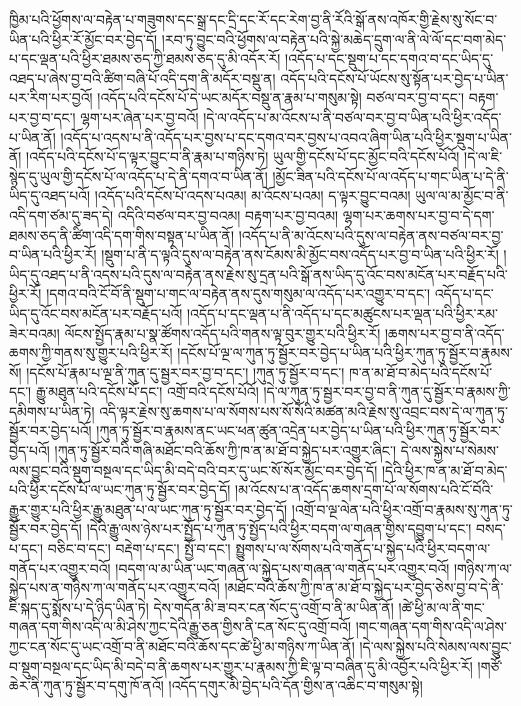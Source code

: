 ཁྱིམ་པའི་ཕྱོགས་ལ་བརྟེན་པ་གཟུགས་དང་སྒྲ་དང་དྲི་དང་རོ་དང་རེག་བྱ་ནི་རོའི་སྒོ་ནས་འཁོར་གྱི་རྗེས་སུ་སོང་བ་ཡིན་པའི་ཕྱིར་རོ་མྱོང་བར་བྱེད་དོ། །རབ་ཏུ་བྱུང་བའི་ཕྱོགས་ལ་བརྟེན་པའི་སྐྱེ་མཆེད་དྲུག་ལ་ནི་ལེ་ལོ་དང་བག་མེད་པ་དང་ལྡན་པའི་ཕྱིར་ཐམས་ཅད་ཀྱི་ཐམས་ཅད་དུ་མི་འདོར་རོ། །འདོད་པ་དང་སྡུག་པ་དང་དགའ་བ་དང་ཡིད་དུ་འཐད་པ་ཞེས་བྱ་བའི་ཚིག་བཞི་པོ་འདི་དག་ནི་མདོར་བསྡུ་ན། འདོད་པའི་དངོས་པོ་ཡོངས་སུ་སྟོན་པར་བྱེད་པ་ཡིན་པར་རིག་པར་བྱའོ། །འདོད་པའི་དངོས་པོ་དེ་ཡང་མདོར་བསྡུ་ན་རྣམ་པ་གསུམ་སྟེ། བཙལ་བར་བྱ་བ་དང་། བརྟག་པར་བྱ་བ་དང་། ལྷག་པར་ཞེན་པར་བྱ་བའོ། །དེ་ལ་འདོད་པ་མ་འོངས་པ་ནི་བཙལ་བར་བྱ་བ་ཡིན་པའི་ཕྱིར་འདོད་པ་ཡིན་ནོ། །འདོད་པ་འདས་པ་ནི་འདོད་པར་བྱས་པ་དང་དགའ་བར་བྱས་པ་འབའ་ཞིག་ཡིན་པའི་ཕྱིར་སྡུག་པ་ཡིན་ནོ། །འདོད་པའི་དངོས་པོ་ད་ལྟར་བྱུང་བ་ནི་རྣམ་པ་གཉིས་ཏེ། ཡུལ་གྱི་དངོས་པོ་དང་མྱོང་བའི་དངོས་པོའོ། །དེ་ལ་ཇི་སྙེད་དུ་ཡུལ་གྱི་དངོས་པོ་ལ་འདོད་པ་དེ་ནི་དགའ་བ་ཡིན་ནོ། །མྱོང་ཟིན་པའི་དངོས་པོ་ལ་འདོད་པ་གང་ཡིན་པ་དེ་ནི་ཡིད་དུ་འཐད་པའོ། །འདོད་པའི་དངོས་པོ་འདས་པའམ། མ་འོངས་པའམ། ད་ལྟར་བྱུང་བའམ། ཡུལ་ལ་མ་མྱོང་བ་ནི་འདི་དག་ཙམ་དུ་ཟད་དེ། འདིའི་བཙལ་བར་བྱ་བའམ། བརྟག་པར་བྱ་བའམ། ལྷག་པར་ཆགས་པར་བྱ་བ་དེ་དག་ཐམས་ཅད་ནི་ཚིག་འདི་དག་གིས་བསྟན་པ་ཡིན་ནོ། །འདོད་པ་ནི་མ་འོངས་པའི་དུས་ལ་བརྟེན་ནས་བཙལ་བར་བྱ་བ་ཡིན་པའི་ཕྱིར་རོ། །སྡུག་པ་ནི་ད་ལྟའི་དུས་ལ་བརྟེན་ནས་ངོམས་མི་མྱོང་བས་འདོད་པར་བྱ་བ་ཡིན་པའི་ཕྱིར་རོ། །ཡིད་དུ་འཐད་པ་ནི་འདས་པའི་དུས་ལ་བརྟེན་ནས་རྗེས་སུ་དྲན་པའི་སྒོ་ནས་ཡིད་དུ་འོང་བས་མངོན་པར་བརྗོད་པའི་ཕྱིར་རོ། །དགའ་བའི་ངོ་བོ་ནི་སྡུག་པ་གང་ལ་བརྟེན་ནས་དུས་གསུམ་ལ་འདོད་པར་འགྱུར་བ་དང་། འདོད་པ་དང་ཡིད་དུ་འོང་བས་མངོན་པར་བརྗོད་པའོ། །འདོད་པ་དང་ལྡན་པ་ནི་འདོད་པ་དང་མཚུངས་པར་ལྡན་པའི་ཕྱིར་རམ་ཟེར་བའམ། ལོངས་སྤྱོད་རྣམ་པ་སྣ་ཚོགས་འདོད་པའི་གནས་ལྟ་བུར་གྱུར་པའི་ཕྱིར་རོ། །ཆགས་པར་བྱ་བ་ནི་འདོད་ཆགས་ཀྱི་གནས་སུ་གྱུར་པའི་ཕྱིར་རོ། །དངོས་པོ་ལྔ་ལ་ཀུན་ཏུ་སྦྱོར་བར་བྱེད་པ་ཡིན་པའི་ཕྱིར་ཀུན་ཏུ་སྦྱོར་བ་རྣམས་སོ། །དངོས་པོ་རྣམ་པ་ལྔ་ནི་ཀུན་དུ་སྦྱར་བར་བྱ་བ་དང་། །ཀུན་ཏུ་སྦྱོར་བ་དང་། ཁ་ན་མ་ཐོ་བ་མེད་པའི་དངོས་པོ་དང་། རྒྱུ་མཐུན་པའི་དངོས་པོ་དང་། འགྲོ་བའི་དངོས་པོའོ། །དེ་ལ་ཀུན་ཏུ་སྦྱར་བར་བྱ་བ་ནི་ཀུན་དུ་སྦྱོར་བ་རྣམས་ཀྱི་དམིགས་པ་ཡིན་ཏེ། འདི་ལྟར་རྗེས་སུ་ཆགས་པ་ལ་སོགས་པས་སོ་སོའི་མཚན་མའི་རྗེས་སུ་འབྲང་བས་དེ་ལ་ཀུན་ཏུ་སྦྱོར་བར་བྱེད་པའོ། །ཀུན་ཏུ་སྦྱོར་བ་རྣམས་ནང་ཡང་ཕན་ཚུན་འདྲེན་པར་བྱེད་པ་ཡིན་པའི་ཕྱིར་ཀུན་ཏུ་སྦྱོར་བར་བྱེད་པའོ། །ཀུན་ཏུ་སྦྱོར་བའི་གཞི་མཐོང་བའི་ཆོས་ཀྱི་ཁ་ན་མ་ཐོ་བ་སྐྱེད་པར་འགྱུར་ཞིང་། དེ་ལས་སྐྱེས་པ་སེམས་ལས་བྱུང་བའི་སྡུག་བསྔལ་དང་ཡིད་མི་བདེ་བའི་བར་དུ་ཡང་སོ་སོར་མྱོང་བར་བྱེད་དོ། །དེའི་ཕྱིར་ཁ་ན་མ་ཐོ་བ་མེད་པའི་ཕྱིར་དངོས་པོ་ལ་ཡང་ཀུན་ཏུ་སྦྱོར་བར་བྱེད་དོ། །མ་འོངས་པ་ན་འདོད་ཆགས་དྲག་པོ་ལ་སོགས་པའི་ངོ་བོའི་རྒྱུར་གྱུར་པའི་ཕྱིར་རྒྱུ་མཐུན་པ་ལ་ཡང་ཀུན་ཏུ་སྦྱོར་བར་བྱེད་དོ། །འགྲོ་བ་ལྔ་ལེན་པའི་ཕྱིར་འགྲོ་བ་རྣམས་སུ་ཀུན་ཏུ་སྦྱོར་བར་བྱེད་དོ། །དེའི་རྒྱུ་ལས་ཉེས་པར་སྤྱོད་པ་ཀུན་ཏུ་སྤྱོད་པའི་ཕྱིར་བདག་ལ་གཞན་གྱིས་དབྱུག་པ་དང་། བསད་པ་དང་། བཅིང་བ་དང་། བརྡེག་པ་དང་། སྤྱོ་བ་དང་། སྤྱུགས་པ་ལ་སོགས་པའི་གནོད་པ་སྐྱེད་པའི་ཕྱིར་བདག་ལ་གནོད་པར་འགྱུར་བའོ། །བདག་ལ་མ་ཡིན་ཡང་གཞན་ལ་སྐྱེད་པས་གཞན་ལ་གནོད་པར་འགྱུར་བའོ། །གཉིས་ཀ་ལ་སྐྱེད་པས་ན་གཉིས་ཀ་ལ་གནོད་པར་འགྱུར་བའོ། །མཐོང་བའི་ཆོས་ཀྱི་ཁ་ན་མ་ཐོ་བ་སྐྱེད་པར་བྱེད་ཅེས་བྱ་བ་དེ་ནི་ཇི་སྐད་དུ་སྨོས་པ་དེ་ཉིད་ཡིན་ཏེ། དེས་གདོན་མི་ཟ་བར་ངན་སོང་དུ་འགྲོ་བ་ནི་མ་ཡིན་ནོ། །ཚེ་ཕྱི་མ་ལ་ནི་གང་གཞན་དག་གིས་འདི་ལ་མི་ཤེས་ཀྱང་དེའི་རྒྱུ་ཅན་གྱིས་ནི་ངན་སོང་དུ་འགྲོ་བའོ། །གང་གཞན་དག་གིས་འདི་ལ་ཤེས་ཀྱང་ངན་སོང་དུ་ཡང་འགྲོ་བ་ནི་མཐོང་བའི་ཆོས་དང་ཚེ་ཕྱི་མ་གཉིས་ཀ་ཡིན་ནོ། །དེ་ལས་སྐྱེས་པའི་སེམས་ལས་བྱུང་བ་སྡུག་བསྔལ་དང་ཡིད་མི་བདེ་བ་ནི་ཆགས་པར་གྱུར་པ་རྣམས་ཀྱི་ཇི་ལྟ་བ་བཞིན་དུ་མི་འབྱོར་པའི་ཕྱིར་རོ། །གཙོ་ཆེར་ནི་ཀུན་ཏུ་སྦྱོར་བ་དགུ་ཁོ་ནའོ། །འདོད་དགུར་མི་བྱེད་པའི་དོན་གྱིས་ན་འཆིང་བ་གསུམ་སྟེ། 